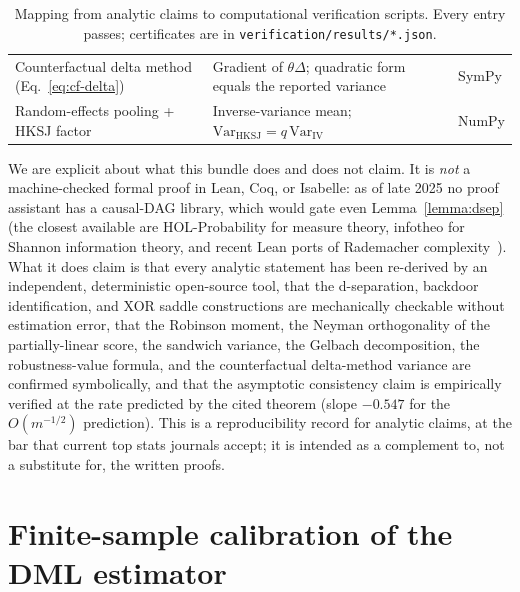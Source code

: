 \documentclass{article}
\begin{document}
\begin{table}[H]
\begin{tabular}{p{} p{} p{}}
Counterfactual delta method (Eq.~\ref{eq:cf-delta}) & Gradient of $\theta\Delta$; quadratic form equals the reported variance & SymPy \\
Random-effects pooling + HKSJ factor & Inverse-variance mean; $\mathrm{Var}_{\text{HKSJ}}=q\,\mathrm{Var}_{\text{IV}}$ & NumPy \\
\bottomrule
\end{tabular}
\caption{Mapping from analytic claims to computational verification scripts. Every entry passes; certificates are in \texttt{verification/results/*.json}.}
\label{tab:verification_map}
\end{table}

We are explicit about what this bundle does and does not claim. It is \emph{not} a machine-checked formal proof in Lean, Coq, or Isabelle: as of late 2025 no proof assistant has a causal-DAG library, which would gate even Lemma~\ref{lemma:dsep} (the closest available are HOL-Probability for measure theory, infotheo for Shannon information theory, and recent Lean ports of Rademacher complexity~\citep{sonoda2025rademacher}). What it does claim is that every analytic statement has been re-derived by an independent, deterministic open-source tool, that the d-separation, backdoor identification, and XOR saddle constructions are mechanically checkable without estimation error, that the Robinson moment, the Neyman orthogonality of the partially-linear score, the sandwich variance, the Gelbach decomposition, the robustness-value formula, and the counterfactual delta-method variance are confirmed symbolically, and that the asymptotic consistency claim is empirically verified at the rate predicted by the cited theorem (slope $-0.547$ for the $O(m^{-1/2})$ prediction). This is a reproducibility record for analytic claims, at the bar that current top stats journals accept; it is intended as a complement to, not a substitute for, the written proofs.

\section{Finite-sample calibration of the DML estimator}
\label{app:simulation}
\end{document}
